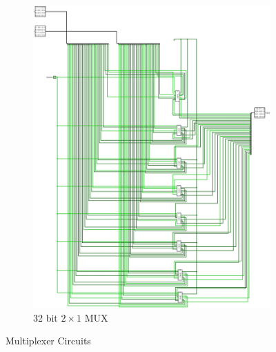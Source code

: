 \documentclass[12pt]{article}
\begin{document}
\begin{figure}[H]
    \begin{subfigure}[b]{0.4\textwidth}
        \includegraphics[width=\textwidth]{MUX_32_bit.jpg}
        \caption{32 bit $2\times1$ MUX}
        \label{fig:32b2x1}
    \end{subfigure}

    \caption{Multiplexer Circuits}\label{fig:mux}
\end{figure}

\newpage
\end{document}
